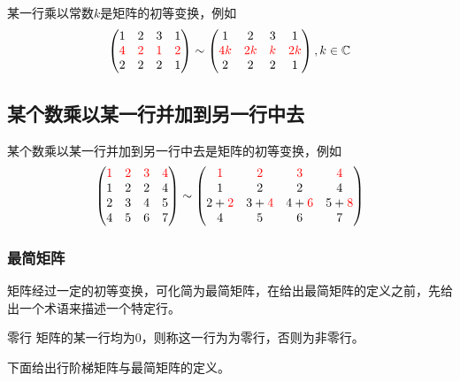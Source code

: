某一行乘以常数$k$是矩阵的初等变换，例如$$\begin{pmatrix}
	1 & 2 & 3 & 1\\
	\textcolor{red}{4} & \textcolor{red}{2} & \textcolor{red}{1} & \textcolor{red}{2}\\
	2 & 2 & 2 & 1
\end{pmatrix}\sim \begin{pmatrix}
	1 & 2 & 3 & 1\\
	\textcolor{red}{4k} & \textcolor{red}{2k} & \textcolor{red}{k} & \textcolor{red}{2k}\\
	2 & 2 & 2 & 1
\end{pmatrix},k\in \mathbb{C}$$

\subsection{某个数乘以某一行并加到另一行中去}

某个数乘以某一行并加到另一行中去是矩阵的初等变换，例如$$\begin{pmatrix}
	\textcolor{red}{1} & \textcolor{red}{2} & \textcolor{red}{3} & \textcolor{red}{4}\\
	1 & 2 & 2 & 4\\
	2 & 3 & 4 & 5\\
	4 & 5 & 6 & 7
\end{pmatrix}\sim \begin{pmatrix}
	\textcolor{red}{1} & \textcolor{red}{2} & \textcolor{red}{3} & \textcolor{red}{4}\\
	1 & 2 & 2 & 4\\
	2+\textcolor{red}{2} & 3+\textcolor{red}{4} & 4+\textcolor{red}{6} & 5+\textcolor{red}{8}\\
	4 & 5 & 6 & 7
\end{pmatrix}$$

\subsubsection{最简矩阵}

矩阵经过一定的初等变换，可化简为最简矩阵，在给出最简矩阵的定义之前，先给出一个术语来描述一个特定行。

\begin{definition}{零行}
	矩阵的某一行均为0，则称这一行为为零行，否则为非零行。
\end{definition}

下面给出行阶梯矩阵与最简矩阵的定义。

